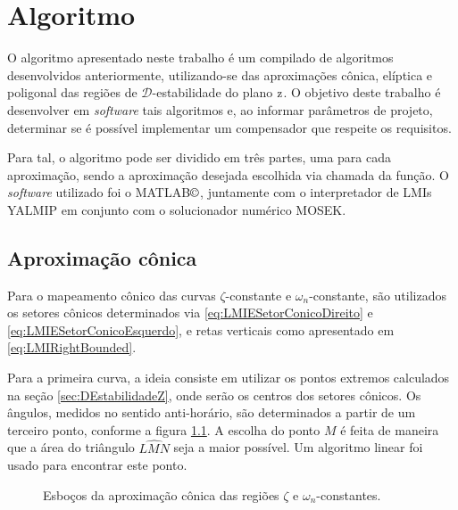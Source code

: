 \chapter{Algoritmo}\label{sec:Algoritmo}

O algoritmo apresentado neste trabalho é um compilado de algoritmos desenvolvidos anteriormente, utilizando-se das aproximações cônica, elíptica e poligonal das regiões de $\mathscr{D}$-estabilidade do plano $\operatorname{\mathrm{z}}$. O objetivo deste trabalho é desenvolver em \emph{software} tais algoritmos e, ao informar parâmetros de projeto, determinar se é possível implementar um compensador que respeite os requisitos.

Para tal, o algoritmo pode ser dividido em três partes, uma para cada aproximação, sendo a aproximação desejada escolhida via chamada da função. O \emph{software} utilizado foi o MATLAB$\copyright$\cite{MATLAB}, juntamente com o interpretador de LMIs YALMIP\cite{LOFBERG2004} em conjunto com o solucionador numérico MOSEK\cite{MOSEK}.

\section{Aproximação cônica}
Para o mapeamento cônico das curvas $\zeta$-constante e $\omega_n$-constante, são utilizados os setores cônicos determinados via \eqref{eq:LMIESetorConicoDireito} e \eqref{eq:LMIESetorConicoEsquerdo}, e retas verticais como apresentado em \eqref{eq:LMIRightBounded}.

Para a primeira curva, a ideia consiste em utilizar os pontos extremos calculados na seção \ref{sec:DEstabilidadeZ}, onde serão os centros dos setores cônicos. Os ângulos, medidos no sentido anti-horário, são determinados a partir de um terceiro ponto, conforme a figura \ref{subfig:AproximacaoConicaZeta}. A escolha do ponto $M$ é feita de maneira que a área do triângulo $\widehat{LMN}$ seja a maior possível. Um algoritmo linear foi usado para encontrar este ponto.

\begin{figure}[!hb]
\centering
\begin{subfigure}[t]{0.4\columnwidth}

\caption{}
\label{subfig:AproximacaoConicaZeta}
\end{subfigure}
\begin{subfigure}[t]{0.4\columnwidth}

\caption{}
\label{subfig:AproximacaoConicaWn}
\end{subfigure}
\caption{Esboços da aproximação cônica das regiões $\zeta$ e $\omega_n$-constantes.}
\label{fig:AproximacoesConica}
\end{figure}

